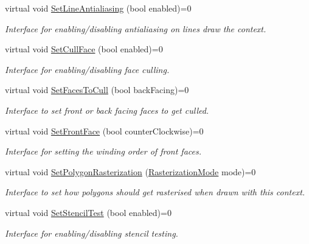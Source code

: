 \begin{DoxyCompactItemize}
virtual void \hyperlink{class_g_f_w_1_1_i_context_state_functions_add655f339107b203288d74e814ae9827}{Set\+Line\+Antialiasing} (bool enabled)=0
\begin{DoxyCompactList}\small\item\em Interface for enabling/disabling antialiasing on lines draw the context. \end{DoxyCompactList}\item 
virtual void \hyperlink{class_g_f_w_1_1_i_context_state_functions_a88c4e68c29c47b63d2d07fd6176f7b07}{Set\+Cull\+Face} (bool enabled)=0
\begin{DoxyCompactList}\small\item\em Interface for enabling/disabling face culling. \end{DoxyCompactList}\item 
virtual void \hyperlink{class_g_f_w_1_1_i_context_state_functions_aeafd5ba03f7ce29872a66fdb1bcaa5f1}{Set\+Faces\+To\+Cull} (bool back\+Facing)=0
\begin{DoxyCompactList}\small\item\em Interface to set front or back facing faces to get culled. \end{DoxyCompactList}\item 
virtual void \hyperlink{class_g_f_w_1_1_i_context_state_functions_a44c131b392dc908ca3bb4f579df5ba57}{Set\+Front\+Face} (bool counter\+Clockwise)=0
\begin{DoxyCompactList}\small\item\em Interface for setting the winding order of front faces. \end{DoxyCompactList}\item 
virtual void \hyperlink{class_g_f_w_1_1_i_context_state_functions_abf50b9cb073e73caa0d49248d1f9cbb0}{Set\+Polygon\+Rasterization} (\hyperlink{namespace_g_f_w_a9e0ba6f593449f3060559ead1bc7e92f}{Rasterization\+Mode} mode)=0
\begin{DoxyCompactList}\small\item\em Interface to set how polygons should get rasterised when drawn with this context. \end{DoxyCompactList}\item 
virtual void \hyperlink{class_g_f_w_1_1_i_context_state_functions_a1fe4a0f924eac70a75cb43803d45be9f}{Set\+Stencil\+Test} (bool enabled)=0
\begin{DoxyCompactList}\small\item\em Interface for enabling/disabling stencil testing. \end{DoxyCompactList}\item 

\end{DoxyCompactItemize}
